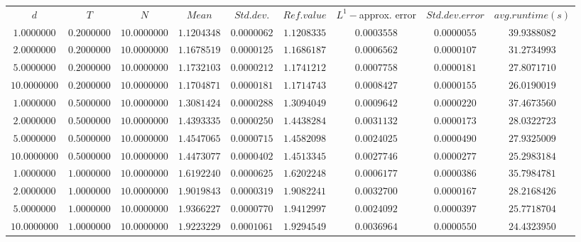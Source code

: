 \begin{tabular}{ccccccccc}
$d$ & $T$ & $N$ & $Mean$ & $Std. dev.$ & $Ref. value$ & $L^1-$approx. error & $Std. dev. error$ & $avg. runtime (s)$\\
$1.0000000$ & $0.2000000$ & $10.0000000$ & $1.1204348$ & $0.0000062$ & $1.1208335$ & $0.0003558$ & $0.0000055$ & $39.9388082$\\
$2.0000000$ & $0.2000000$ & $10.0000000$ & $1.1678519$ & $0.0000125$ & $1.1686187$ & $0.0006562$ & $0.0000107$ & $31.2734993$\\
$5.0000000$ & $0.2000000$ & $10.0000000$ & $1.1732103$ & $0.0000212$ & $1.1741212$ & $0.0007758$ & $0.0000181$ & $27.8071710$\\
$10.0000000$ & $0.2000000$ & $10.0000000$ & $1.1704871$ & $0.0000181$ & $1.1714743$ & $0.0008427$ & $0.0000155$ & $26.0190019$\\
$1.0000000$ & $0.5000000$ & $10.0000000$ & $1.3081424$ & $0.0000288$ & $1.3094049$ & $0.0009642$ & $0.0000220$ & $37.4673560$\\
$2.0000000$ & $0.5000000$ & $10.0000000$ & $1.4393335$ & $0.0000250$ & $1.4438284$ & $0.0031132$ & $0.0000173$ & $28.0322723$\\
$5.0000000$ & $0.5000000$ & $10.0000000$ & $1.4547065$ & $0.0000715$ & $1.4582098$ & $0.0024025$ & $0.0000490$ & $27.9325009$\\
$10.0000000$ & $0.5000000$ & $10.0000000$ & $1.4473077$ & $0.0000402$ & $1.4513345$ & $0.0027746$ & $0.0000277$ & $25.2983184$\\
$1.0000000$ & $1.0000000$ & $10.0000000$ & $1.6192240$ & $0.0000625$ & $1.6202248$ & $0.0006177$ & $0.0000386$ & $35.7984781$\\
$2.0000000$ & $1.0000000$ & $10.0000000$ & $1.9019843$ & $0.0000319$ & $1.9082241$ & $0.0032700$ & $0.0000167$ & $28.2168426$\\
$5.0000000$ & $1.0000000$ & $10.0000000$ & $1.9366227$ & $0.0000770$ & $1.9412997$ & $0.0024092$ & $0.0000397$ & $25.7718704$\\
$10.0000000$ & $1.0000000$ & $10.0000000$ & $1.9223229$ & $0.0001061$ & $1.9294549$ & $0.0036964$ & $0.0000550$ & $24.4323950$\\
\end{tabular}
